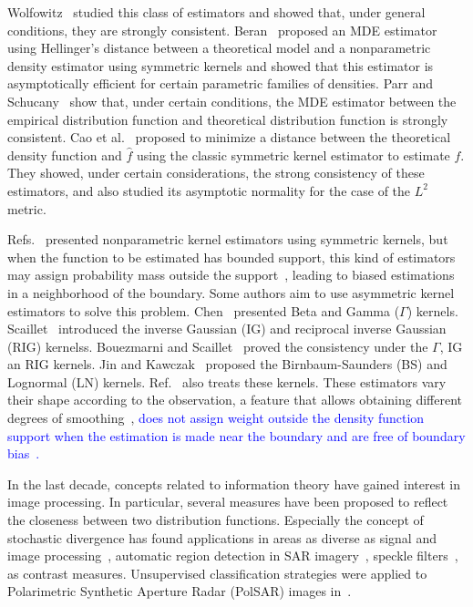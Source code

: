 \documentclass[twocolumn]{svjour3}
\begin{document}
Wolfowitz~\cite{wolfowitz1953, wolfowitz1957} studied this class of estimators and showed that, under general conditions, they are strongly consistent. 
Beran~\cite{beran1977} proposed an MDE estimator using Hellinger's distance between a theoretical model and a nonparametric density estimator using symmetric kernels and showed that this estimator is asymptotically efficient for certain parametric families of densities. 
Parr and Schucany~\cite{parr1982} show that, under certain conditions, the MDE estimator between the empirical distribution function and theoretical distribution function is strongly consistent. 
Cao et al.~\cite{cao1995minimum} proposed to minimize a distance between the theoretical density function and $\widehat{f}$ using the classic symmetric kernel estimator to estimate $f$. 
They showed, under certain considerations, the strong consistency of these estimators, and also studied its asymptotic normality for the case of the $L^2$ metric.

Refs.~\cite{Parzen62,Roseanblatt56} presented nonparametric kernel estimators using symmetric kernels, but when the function to be estimated has bounded support, this kind of estimators may assign probability mass outside the support~\cite{Silverman1986}, leading to biased estimations in a neighborhood of the boundary.
Some authors aim to use asymmetric kernel estimators to solve this problem. 
Chen~\cite{chen1999,chensx2000} presented Beta and Gamma ($\Gamma$) kernels.
Scaillet~\cite{Scaillet2004} introduced the inverse Gaussian (IG) and reciprocal inverse Gaussian (RIG) kernelss.
Bouezmarni and Scaillet~\cite{bouezmarni2005} proved the consistency under the $\Gamma$, IG an RIG kernels. 
Jin and Kawczak~\cite{Jin2003} proposed the Birnbaum-Saunders (BS) and Lognormal (LN) kernels. 
Ref.~\cite{libengue2013} also treats these kernels. 
These estimators vary their shape according to the observation, a feature that allows obtaining different degrees of smoothing~\cite{Scaillet2004}, \textcolor{blue}{does not assign weight outside the density function support when the estimation is made near the boundary and are free of boundary bias~\cite{chensx2000}.}

In the last decade, concepts related to information theory have gained interest in image processing. 
In particular, several measures have been proposed to reflect the closeness between two distribution functions. 
Especially the concept of stochastic divergence has found applications in areas as diverse as signal and image processing~\cite{Aviyente2007}, automatic region detection in SAR imagery~\cite{SilvaCribariFrery:ImprovedLikelihood:Environmetrics,Nascimento2009}, 
speckle filters~\cite{Penna2019}, as contrast measures. 
Unsupervised classification strategies were applied to Polarimetric Synthetic Aperture Radar (PolSAR) images in~\cite{Carvalho2019}.
\end{document}
